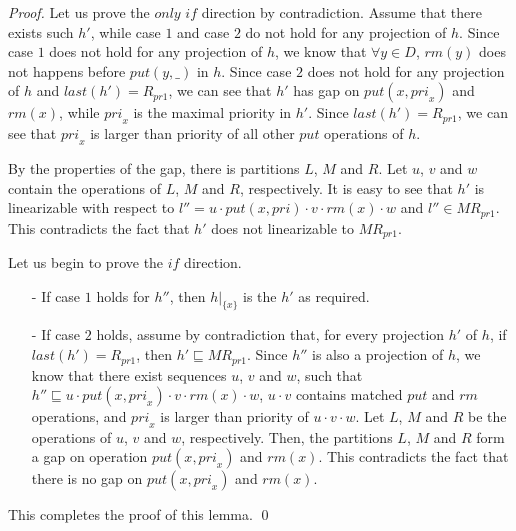 \documentclass{llncs}
\begin{document}
\begin {proof}

Let us prove the $\textit{only if}$ direction by contradiction. Assume that there exists such $h'$, while case $1$ and case $2$ do not hold for any projection of $h$. Since case $1$ does not hold for any projection of $h$, we know that $\forall y \in D$, $\textit{rm}(y)$ does not happens before $\textit{put}(y,\_)$ in $h$. Since case $2$ does not hold for any projection of $h$ and $\textit{last}(h') = R_{\textit{pr1}}$, we can see that $h'$ has gap on $\textit{put}(x,\textit{pri}_x)$ and $\textit{rm}(x)$, while $\textit{pri}_x$ is the maximal priority in $h'$. Since $\textit{last}(h') = R_{\textit{pr1}}$, we can see that $\textit{pri}_x$ is larger than priority of all other $\textit{put}$ operations of $h$.

By the properties of the gap, there is partitions $L$, $M$ and $R$. Let $u$, $v$ and $w$ contain the operations of $L$, $M$ and $R$, respectively. It is easy to see that $h'$ is linearizable with respect to $l''=u \cdot \textit{put}(x,\textit{pri}) \cdot v \cdot \textit{rm}(x) \cdot w$ and $l'' \in \textit{MR}_{\textit{pr1}}$. This contradicts the fact that $h'$ does not linearizable to $\textit{MR}_{\textit{pr1}}$.

Let us begin to prove the $\textit{if}$ direction.

\begin{itemize}
\setlength{\itemsep}{0.5pt}
\item[-] If case $1$ holds for $h''$, then $h \vert_{ \{ x \} }$ is the $h'$ as required.

\item[-] If case $2$ holds, assume by contradiction that, for every projection $h'$ of $h$, if $\textit{last}(h') = R_{\textit{pr1}}$, then $h' \sqsubseteq \textit{MR}_{\textit{pr1}}$. Since $h''$ is also a projection of $h$, we know that there exist sequences $u$, $v$ and $w$, such that $h'' \sqsubseteq u \cdot \textit{put}(x,\textit{pri}_x) \cdot v \cdot \textit{rm}(x) \cdot w$, $u \cdot v$ contains matched $\textit{put}$ and $\textit{rm}$ operations, and $\textit{pri}_x$ is larger than priority of $u \cdot v \cdot w$. Let $L$, $M$ and $R$ be the operations of $u$, $v$ and $w$, respectively. Then, the partitions $L$, $M$ and $R$ form a gap on operation $\textit{put}(x,\textit{pri}_x)$ and $\textit{rm}(x)$. This contradicts the fact that there is no gap on $\textit{put}(x,\textit{pri}_x)$ and $\textit{rm}(x)$.
\end{itemize}

This completes the proof of this lemma. \qed
\end {proof}
\end{document}
